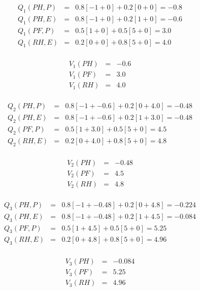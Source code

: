 \documentclass[12pt]{article}
\begin{document}
\begin{enumerate}
  \begin{eqnarray*}
    Q_1(PH, P) &=& 0.8[-1 + 0] + 0.2[0 + 0] = -0.8 \\[.1in]
    Q_1(PH, E) &=& 0.8[-1 + 0] + 0.2[1 + 0] = -0.6 \\[.1in]
    Q_1(PF, P) &=& 0.5[1 + 0] + 0.5[5 + 0] = 3.0 \\[.1in]
    Q_1(RH, E) &=& 0.2[0 + 0] + 0.8[5 + 0] = 4.0 \\[.1in]
  \end{eqnarray*}

  \begin{eqnarray*}
    V_1(PH) &=& -0.6 \\[.1in]
    V_1(PF) &=& 3.0 \\[.1in]
    V_1(RH) &=& 4.0 \\[.1in]
  \end{eqnarray*}

  \begin{eqnarray*}
    Q_2(PH, P) &=& 0.8[-1 + -0.6] + 0.2[0 + 4.0] = -0.48 \\[.1in]
    Q_2(PH, E) &=& 0.8[-1 + -0.6] + 0.2[1 + 3.0] = -0.48 \\[.1in]
    Q_2(PF, P) &=& 0.5[1 + 3.0] + 0.5[5 + 0] = 4.5 \\[.1in]
    Q_2(RH, E) &=& 0.2[0 + 4.0] + 0.8[5 + 0] = 4.8 \\[.1in]
  \end{eqnarray*}

  \begin{eqnarray*}
    V_2(PH) &=& -0.48 \\[.1in]
    V_2(PF) &=& 4.5 \\[.1in]
    V_2(RH) &=& 4.8 \\[.1in]
  \end{eqnarray*}

  \begin{eqnarray*}
    Q_3(PH, P) &=& 0.8[-1 + -0.48] + 0.2[0 + 4.8] = -0.224 \\[.1in]
    Q_3(PH, E) &=& 0.8[-1 + -0.48] + 0.2[1 + 4.5] = -0.084 \\[.1in]
    Q_3(PF, P) &=& 0.5[1 + 4.5] + 0.5[5 + 0] = 5.25 \\[.1in]
    Q_3(RH, E) &=& 0.2[0 + 4.8] + 0.8[5 + 0] = 4.96 \\[.1in]
  \end{eqnarray*}

  \begin{eqnarray*}
    V_3(PH) &=& -0.084 \\[.1in]
    V_3(PF) &=& 5.25 \\[.1in]
    V_3(RH) &=& 4.96 \\[.1in]
  \end{eqnarray*}


\end{enumerate}
\end{document}

